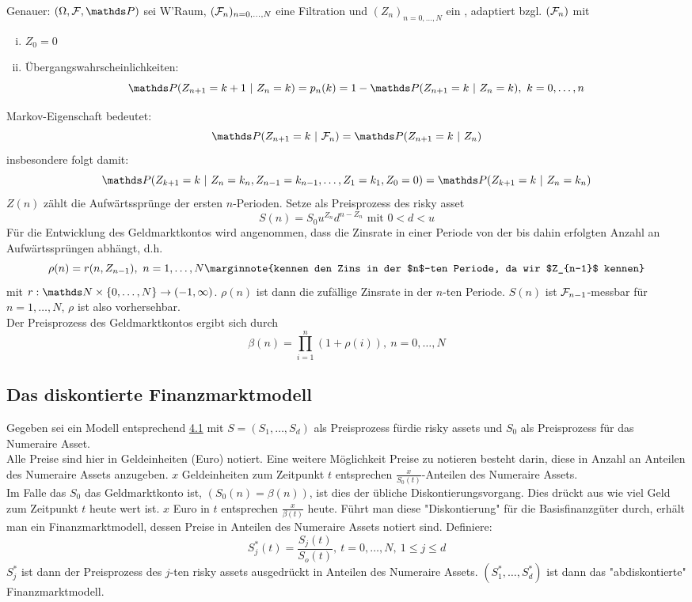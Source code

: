 \begin{enumerate}[(a)]
	Genauer: $(\Omega,\F,\Pw)$ sei W'Raum, $(\mathcal{F}_n)_{n=0,\dots,N}$ eine Filtration und $(Z_n)_{n=0,\dots,N}$ ein , adaptiert bzgl. $(\mathcal{F}_n)$ mit
	\begin{enumerate}[(i)]
		\item $Z_0=0$
		\item Übergangswahrscheinlichkeiten:
		\[
		\Pw(Z_{n+1}=k+1~|~Z_n=k)=p_n(k)=1-\Pw(Z_{n+1}=k~|~Z_n=k),~ k=0,\dots,n
		\]
	\end{enumerate}
	Markov-Eigenschaft bedeutet:
	\[
	\Pw(Z_{n+1}=k~|~\F_n)=\Pw(Z_{n+1}=k~|~Z_n)
	\]
	insbesondere folgt damit:
	\[
	\Pw(Z_{k+1}=k~|~Z_n=k_n,Z_{n-1}=k_{n-1},\dots,Z_1=k_1,Z_0=0)=\Pw(Z_{k+1}=k~|~Z_n=k_n)
	\]
	$Z(n)$ zählt die Aufwärtssprünge der ersten $n$-Perioden. Setze als Preisprozess des risky asset
	\[
	S(n)=S_0u^{Z_n}d^{n-Z_n}\text{ mit }0<d<u
	\]
	Für die Entwicklung des Geldmarktkontos wird angenommen, dass die Zinsrate in einer Periode von der bis dahin erfolgten Anzahl an Aufwärtssprüngen abhängt, d.h.
	\[
	\rho(n)=r(n,Z_{n-1}),~n=1,\dots,N \marginnote{kennen den Zins in der $n$-ten Periode, da wir $Z_{n-1}$ kennen}
	\]
	mit $r:\N\times \{0,\dots,N\}\to (-1,\infty)$. 
	$\rho(n)$ ist dann die zufällige Zinsrate in der $n$-ten Periode. 
	$S(n)$ ist $\mathcal{F}_{n-1}$-messbar für $n=1,\dots,N$, $\rho$ ist also vorhersehbar.\\
	Der Preisprozess des Geldmarktkontos ergibt sich durch
	\[
	\beta(n)=\prod_{i=1}^{n}(1+\rho(i)),~n=0,\dots,N
	\]
\end{enumerate}

\subsection{Das diskontierte Finanzmarktmodell}
\label{sub:disk_finanzmarktmodell}
Gegeben sei ein Modell entsprechend \hyperref[sub:beschreibung_fimarkt]{4.1} mit $S=(S_1,\dots,S_d)$ als Preisprozess fürdie risky assets und $S_0$ als Preisprozess für das Numeraire Asset.\\
Alle Preise sind hier in Geldeinheiten (Euro) notiert. 
Eine weitere Möglichkeit Preise zu notieren besteht darin, diese in Anzahl an Anteilen des Numeraire Assets anzugeben. 
$x$ Geldeinheiten zum Zeitpunkt $t$ entsprechen $\frac{x}{S_0(t)}$-Anteilen des Numeraire Assets.\\
Im Falle das $S_0$ das Geldmarktkonto ist, $(S_0(n)=\beta(n))$, ist dies der übliche Diskontierungsvorgang. 
Dies drückt aus wie viel Geld zum Zeitpunkt $t$ heute wert ist. 
$x$ Euro in $t$ entsprechen $\frac{x}{\beta(t)}$ heute. 
Führt man diese "Diskontierung" für die Basisfinanzgüter durch, erhält man ein Finanzmarktmodell, dessen Preise in Anteilen des Numeraire Assets notiert sind.
Definiere:
\[
S_j^*(t)=\frac{S_j(t)}{S_o(t)},~t=0,\dots,N,~1\le j \le d
\]
$S_j^*$ ist dann der Preisprozess des $j$-ten risky assets ausgedrückt in Anteilen des Numeraire Assets.
$(S_1^*,\dots,S_d^*)$ ist dann das "abdiskontierte" Finanzmarktmodell.

